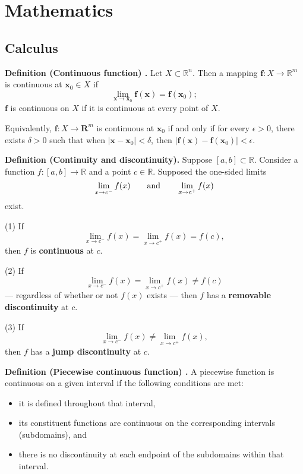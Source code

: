 \chapter{Mathematics}
\section{Calculus}

\begin{shaded}
\textbf{Definition (Continuous function) \cite{hubbard_hubbard}.} Let $X \subset \mathbb{R}^n$. Then a mapping $\mathbf{f} : X \to \mathbb{R}^m$ is continuous at $\mathbf{x}_0 \in X$ if
$$ \lim_{\mathbf{x} \to \mathbf{x}_0} \mathbf{f}(\mathbf{x}) = \mathbf{f}(\mathbf{x}_0); $$
$\mathbf{f}$ is continuous on $X$ if it is continuous at every point of $X$.

Equivalently, $\mathbf{f}: X \to \mathbf{R}^m$ is continuous at $\mathbf{x}_0$ if and only if for every $\epsilon > 0$, there exists $\delta > 0$ such that when $|\mathbf{x} - \mathbf{x}_0| < \delta$, then $|\mathbf{f}(\mathbf{x}) - \mathbf{f}(\mathbf{x}_0)| < \epsilon$.
\end{shaded}

\begin{shaded}
\textbf{Definition (Continuity and discontinuity).} Suppose $[a, b] \subset \mathbb{R}$. Consider a function $f : [a, b] \to \mathbb{R}$ and a point $c \in \mathbb{R}$. Supposed the one-sided limits
$$ \lim_{x \to c^-} f(x) \qquad \textnormal{and} \qquad \lim_{x \to c^+} f(x) $$
exist.

(1) If
$$ \lim_{x \to c^-} f(x) = \lim_{x \to c^+} f(x) = f(c) , $$
then $f$ is \textbf{continuous} at $c$.

(2) If
$$ \lim_{x \to c^-} f(x) = \lim_{x \to c^+} f(x) \not= f(c) $$
--- regardless of whether or not $f(x)$ exists --- then $f$ has a \textbf{removable discontinuity} at $c$.

(3) If
$$ \lim_{x \to c^-} f(x) \not= \lim_{x \to c^+} f(x) , $$
then $f$ has a \textbf{jump discontinuity} at $c$.
\end{shaded}

\begin{shaded}
\textbf{Definition (Piecewise continuous function) \cite{wikipedia_piecewise}.} A piecewise function is continuous on a given interval if the following conditions are met:
\begin{itemize}
	\item it is defined throughout that interval,
	\item its constituent functions are continuous on the corresponding intervals (subdomains), and
	\item there is no discontinuity at each endpoint of the subdomains within that interval.
\end{itemize}
\end{shaded}